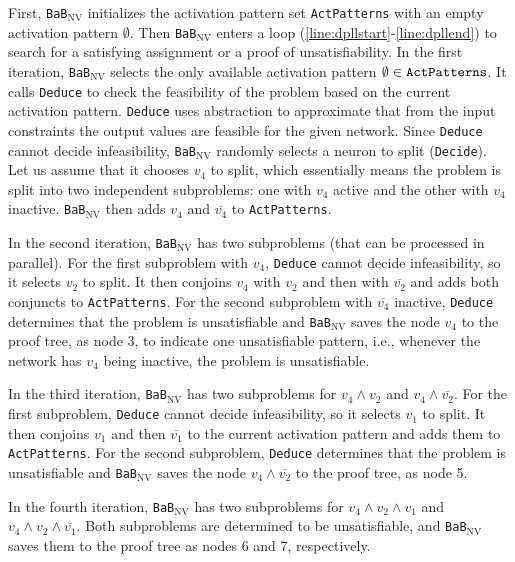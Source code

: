 \documentclass[oneside,11pt,dvipsnames]{book}
\newcommand{\functiontextformat}[1]{\textrm{\texttt{#1}}}
\newcommand{\dd}{\texttt{BaB$_{\text{NV}}$}}
\begin{document}
First, \dd{} initializes the activation pattern set \functiontextformat{ActPatterns} with an empty activation pattern $\emptyset$. Then \dd{} enters a loop (\autoref{line:dpllstart}-\autoref{line:dpllend}) to search for a satisfying assignment or a proof of unsatisfiability. In the first iteration, \dd{} selects the only available activation pattern $\emptyset \in \functiontextformat{ActPatterns}$. 
It calls \functiontextformat{Deduce} to check the feasibility of the problem based on the current activation pattern. \functiontextformat{Deduce} uses abstraction to approximate that from the input constraints the output values are feasible for the given network. 
Since \functiontextformat{Deduce} cannot decide infeasibility, \dd{} randomly selects a neuron to split (\functiontextformat{Decide}). Let us assume that it chooses $v_4$ to split, which essentially means the problem is split into two independent subproblems: one with $v_4$ active and the other with $v_4$ inactive.
\dd{} then adds $v_4$ and $\overline{v_4}$ to \functiontextformat{ActPatterns}.

In the second iteration, \dd{} has two subproblems (that can be processed in parallel). For the first subproblem with $v_4$, \functiontextformat{Deduce} cannot decide infeasibility, so it selects $v_2$ to split. It then conjoins $v_4$ with $v_2$ and then with $\overline{v_2}$ and adds both conjuncts to \texttt{ActPatterns}. 
For the second subproblem with $\overline{v_4}$ inactive, \functiontextformat{Deduce} determines that the problem is unsatisfiable and \dd{} saves the node $v_4$ to the proof tree, as node 3, to indicate one unsatisfiable pattern, i.e., whenever the network has $v_4$ being inactive, the problem is unsatisfiable.

In the third iteration, \dd{} has two subproblems for $v_4 \land v_2$ and $v_4 \land \overline{v_2}$. For the first subproblem, \functiontextformat{Deduce} cannot decide infeasibility, so it selects $v_1$ to split. It then conjoins $v_1$ and then $\overline{v_1}$ to the current activation pattern and adds them to \functiontextformat{ActPatterns}. For the second subproblem, \functiontextformat{Deduce} determines that the problem is unsatisfiable and \dd{} saves the node $v_4 \land \overline{v_2}$ to the proof tree, as node 5.

In the fourth iteration, \dd{} has two subproblems for $v_4 \land v_2 \land v_1$ and $v_4 \land v_2 \land \overline{v_1}$. Both subproblems are determined to be unsatisfiable, and \dd{} saves them to the proof tree as nodes 6 and 7, respectively.
\end{document}
